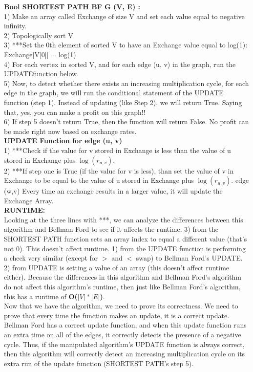 \documentclass[11pt, solution, letterpaper]{format}
\begin{document}
\textbf{Bool SHORTEST PATH BF G (V, E) :}\\
1) Make an array called Exchange of size V and set each value equal to negative infinity.\\
2) Topologically sort V\\
3) ***Set the 0th element of sorted V to have an Exchange value equal to log(1): Exchange[V[0]] = log(1)\\
4) For each vertex in sorted V, and for each edge (u, v) in the graph, run the UPDATEfunction below. \\
5) Now, to detect whether there exists an increasing multiplication cycle, for each edge in the graph, we will run the conditional statement of the UPDATE function (step 1). Instead of updating (like Step 2), we will return True. Saying that, yes, you can make a profit on this graph!!\\
6) If step 5 doesn't return True, then the function will return False. No profit can be made right now based on exchange rates. \\

\textbf{UPDATE Function for edge (u, v)}\\
1) ***Check if the value for v stored in Exchange is less than the value of u stored in Exchange plus $\log(r_{u, v})$.\\
2) ***If step one is True (if the value for v is less), than set the value of v in Exchange to be equal to the value of u stored in Exchange plus $\log(r_{u, v})$.
edge (w,v) Every time an exchange results in a larger value, it will update the Exchange Array.\\

\textbf{RUNTIME:} \\Looking at the three lines with ***, we can analyze the differences between this algorithm and Bellman Ford to see if it affects the runtime. 3) from the SHORTEST PATH  function sets an array index to equal a different value (that's not 0). This doesn't affect runtime. 1) from the UPDATE function is performing a check very similar (except for $>$ and $<$ swap) to Bellman Ford's 
UPDATE. 2) from UPDATE is setting a value of an array (this doesn't affect runtime either). Because the differences in this algorithm and Bellman Ford's algorithm do not affect this algorithm's runtime, then just like Bellman Ford's algorithm, this has a runtime of \textbf{O($|V|*|E|$)}. \\

Now that we have the algorithm, we need to prove its correctness. We need to prove that every time the function makes an update, it is a correct update. Bellman Ford has a correct update function, and when this update function runs an extra time on all of the edges, it correctly detects the presence of a negative cycle. Thus, if the manipulated algorithm's UPDATE function is always correct, then this algorithm will correctly detect an increasing multiplication cycle on its extra run of the update function (SHORTEST PATH's step 5).\\
\end{document}
